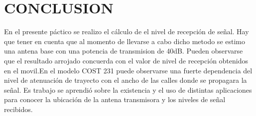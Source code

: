 \documentclass[conference, 9pt, a4paper]{IEEEtran}
\begin{document}
\section{CONCLUSION}
En el presente páctico se realizo el cálculo de el nivel de recepción de señal.
Hay que tener en cuenta que al momento de llevarse a cabo dicho metodo se estimo una antena base con una potencia de transmision de 40dB.
Pueden observarse que el resultado  arrojado concuerda con el valor  de nivel de recepción obtenidos en el movil.En el 
modelo COST 231 puede observarse una fuerte dependencia del nivel de atenuación de trayecto con el ancho de las calles donde se propagara la señal.
Es trabajo se  aprendió  sobre la existencia y el uso de distintas aplicaciones  para conocer la ubicación de la antena transmisora y  los niveles de señal recibidos. 
















	



\end{document}
